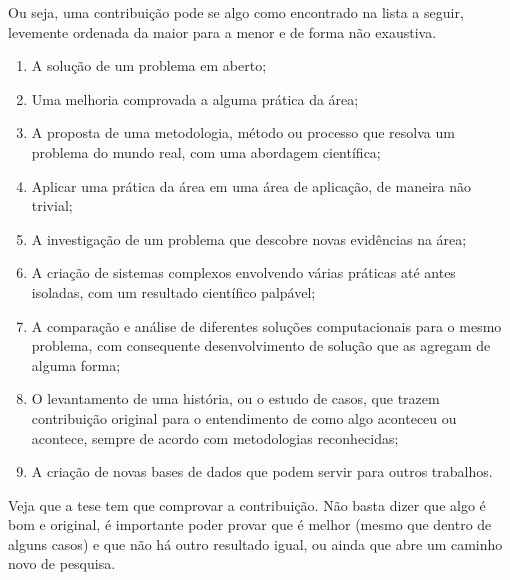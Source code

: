 Ou seja, uma contribuição pode se algo como encontrado na lista a seguir, levemente ordenada da maior para a menor e de forma não exaustiva.
\begin{enumerate}
\item	A solução de um problema em aberto;
\item	Uma melhoria comprovada a alguma prática da área;
\item	A proposta de uma metodologia, método ou processo que resolva um problema do mundo real, com uma abordagem científica;
\item	Aplicar uma prática da área em uma área de aplicação, de maneira não trivial;
\item	A investigação de um problema que descobre novas evidências na área;
\item	A criação de sistemas complexos envolvendo várias práticas até antes isoladas, com um resultado científico palpável;
\item	A comparação e análise de diferentes soluções computacionais para o mesmo problema, com consequente desenvolvimento de solução que as agregam de alguma forma;
\item	O levantamento de uma história, ou o estudo de casos, que trazem contribuição original para o entendimento de como algo aconteceu ou acontece, sempre de acordo com metodologias reconhecidas;
\item	A criação de novas bases de dados que podem servir para outros trabalhos.
\end{enumerate}


Veja que a tese tem que comprovar a contribuição. Não basta dizer que algo é bom e original, é importante poder provar que é melhor (mesmo que dentro de alguns casos) e que não há outro resultado igual, ou ainda que abre um caminho novo de pesquisa.



